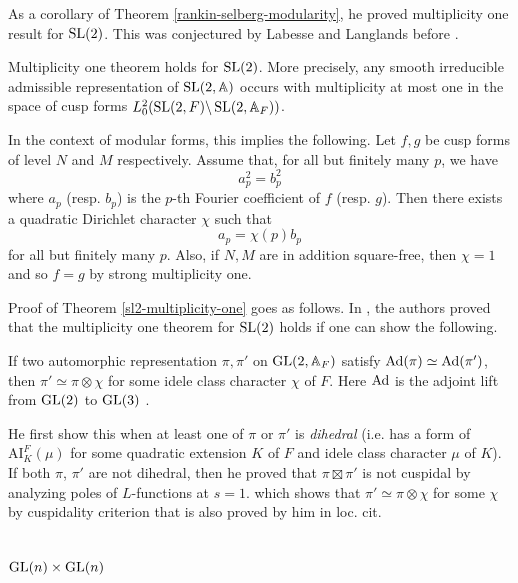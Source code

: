 As a corollary of Theorem \ref{rankin-selberg-modularity}, he proved multiplicity one result for $\operatorname{\mathrm{SL}}(2)$.
This was conjectured by Labesse and Langlands before \cite{labesse1979indistinguishability}.
\begin{theorem}
\label{sl2-multiplicity-one}
Multiplicity one theorem holds for $\operatorname{\mathrm{SL}}(2)$. 
More precisely, any smooth irreducible admissible representation of $\operatorname{\mathrm{SL}}(2, \mathbb{A})$ occurs with 
multiplicity at most one in the space of cusp forms $L^{2}_{0}(\operatorname{\mathrm{SL}}(2, F)\backslash\operatorname{\mathrm{SL}}(2, \mathbb{A}_{F}))$.
\end{theorem}
In the context of modular forms, this implies the following.
Let $f, g$ be cusp forms of level $N$ and $M$ respectively.
Assume that, for all but finitely many $p$, we have
$$
    a_{p}^{2} = b_{p}^{2}
$$
where $a_{p}$ (resp. $b_{p}$) is the $p$-th Fourier coefficient of $f$ (resp. $g$).
Then there exists a quadratic Dirichlet character $\chi$ such that
$$
    a_{p} = \chi(p)b_{p}
$$
for all but finitely many $p$.
Also, if $N, M$ are in addition square-free, then $\chi = 1$ and so $f = g$ by strong multiplicity one.

Proof of Theorem \ref{sl2-multiplicity-one} goes as follows. 
In \cite{labesse1979indistinguishability}, the authors proved that the multiplicity one theorem for $\operatorname{\mathrm{SL}}(2)$ 
holds if one can show the following.
\begin{theorem}
If two automorphic representation $\pi, \pi'$ on $\operatorname{\mathrm{GL}}(2, \mathbb{A}_{F})$ satisfy
$\operatorname{\mathrm{Ad}}(\pi)\simeq \operatorname{\mathrm{Ad}}(\pi')$, then $\pi' \simeq \pi \otimes \chi$ for some idele class character $\chi$ of $F$.
Here $\operatorname{\mathrm{Ad}}$ is the adjoint lift from $\operatorname{\mathrm{GL}}(2)$ to $\operatorname{\mathrm{GL}}(3)$ \cite{gelbart1976relation}.
\end{theorem}
He first show this when at least one of $\pi$ or $\pi'$ is \emph{dihedral} (i.e. has a form of $\mathrm{AI}_{K}^{F}(\mu)$ for some 
quadratic extension $K$ of $F$ and idele class character $\mu$ of $K$).
If both $\pi$, $\pi'$ are not dihedral, then he proved that $\pi \boxtimes \pi'$ is not cuspidal by
analyzing poles of $L$-functions at $s = 1$.
which shows that $\pi' \simeq \pi \otimes \chi$ for some $\chi$ by cuspidality criterion that is also proved by him in loc. cit.


\section{$\operatorname{\mathrm{GL}}(n)\times \operatorname{\mathrm{GL}}(n)$}

